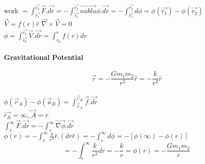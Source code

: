 \documentclass[12]{article}
\begin{document}
work $=\int_{\vec{r_{1}}}^{\vec{r_{2}}}\vec{F}.\vec{dr}=-\int_{\vec{r_{1}}}^{\vec{r_{2}}}\vec{nabla}\phi.\vec{dr}=-\int_{\vec{r_{1}}}^{\vec{r_{2}}}d \phi=\phi(\vec{r_{1}})-\phi(\vec{r_{2}})$\\

$\vec{V}=f(r) \hat{r}$ \hspace{1cm} $\vec{\nabla}\times \vec{V}=0$\\

$\phi=\int_{\vec{r_{0}}}^{\vec{r_{1}}}\vec{V}.\vec{dr}=\int_{r_{0}}^{r}f(r) dr$\\

\newpage

\paragraph*{Gravitational Potential\\}

$$\vec{r}=-\frac{Gm_{1}m_{2}}{r^{2}}\hat{r}=-\frac{k}{r^{2}}\hat{r}$$\\

$\phi(\vec{r}_{A})-\phi(\vec{u}_{B})=\int_{\vec{r}_{A}}^{\vec{r}_{B}}\vec{f}.\vec{dr}$\\

$\vec{r_{B}}=\infty$,$\vec{\_{A}}=r$\\

$\int_{r}^{\infty}\vec{F}.\vec{dr}=-\int_{r}^{\infty}\vec{\nabla\phi}.\vec{dr}$\\

$\phi(r)=-\int_{r}^{\infty}\frac{k}{r^{2}}\hat{r}.(dr\hat{r})=-\int_{r}^{\infty}d\phi=-[\phi(\infty)-\phi(r)]$\\

$$=-\int_{r}^{\infty}\frac{k}{r^2}dr=-\frac{k}{r}=\phi(r)=-\frac{Gm_{1}m_{2}}{r}$$
\end{document}

